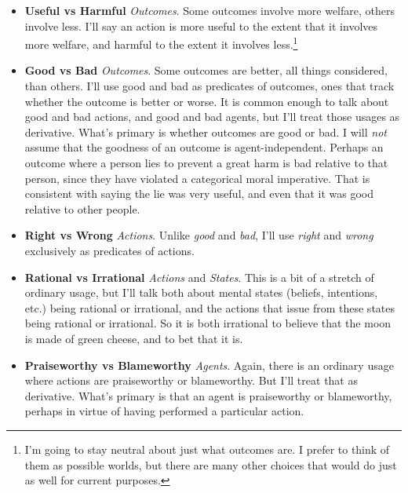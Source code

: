\begin{itemize}
\item{} \textbf{Useful vs Harmful} \emph{Outcomes}. Some outcomes involve more welfare, others involve less. I'll say an action is more useful to the extent that it involves more welfare, and harmful to the extent it involves less.\footnote{I'm going to stay neutral about just what outcomes are. I prefer to think of them as possible worlds, but there are many other choices that would do just as well for current purposes.}

\item{} \textbf{Good vs Bad} \emph{Outcomes}. Some outcomes are better, all things considered, than others. I'll use good and bad as predicates of outcomes, ones that track whether the outcome is better or worse. It is common enough to talk about good and bad actions, and good and bad agents, but I'll treat those usages as derivative. What's primary is whether outcomes are good or bad. I will \emph{not} assume that the goodness of an outcome is agent-independent. Perhaps an outcome where a person lies to prevent a great harm is bad relative to that person, since they have violated a categorical moral imperative. That is consistent with saying the lie was very useful, and even that it was good relative to other people.

\item{} \textbf{Right vs Wrong} \emph{Actions}. Unlike \emph{good} and \emph{bad}, I'll use \emph{right} and \emph{wrong} exclusively as predicates of actions.

\item{} \textbf{Rational vs Irrational} \emph{Actions} and \emph{States}. This is a bit of a stretch of ordinary usage, but I'll talk both about mental states (beliefs, intentions, etc.) being rational or irrational, and the actions that issue from these states being rational or irrational. So it is both irrational to believe that the moon is made of green cheese, and to bet that it is.

\item{} \textbf{Praiseworthy vs Blameworthy} \emph{Agents}. Again, there is an ordinary usage where actions are praiseworthy or blameworthy. But I'll treat that as derivative. What's primary is that an agent is praiseworthy or blameworthy, perhaps in virtue of having performed a particular action.

\end{itemize}
